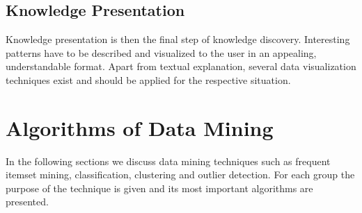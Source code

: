 \subsection{Knowledge Presentation}

Knowledge presentation is then the final step of knowledge discovery. Interesting patterns have to be described and visualized to the user in an appealing, understandable format. Apart from textual explanation, several data visualization techniques exist and should be applied for the respective situation.


\section{Algorithms of Data Mining}\label{section:datamining}
In the following sections we discuss data mining techniques such as frequent itemset mining, classification, clustering and outlier detection.
For each group the purpose of the technique is given and its most important algorithms are presented.

